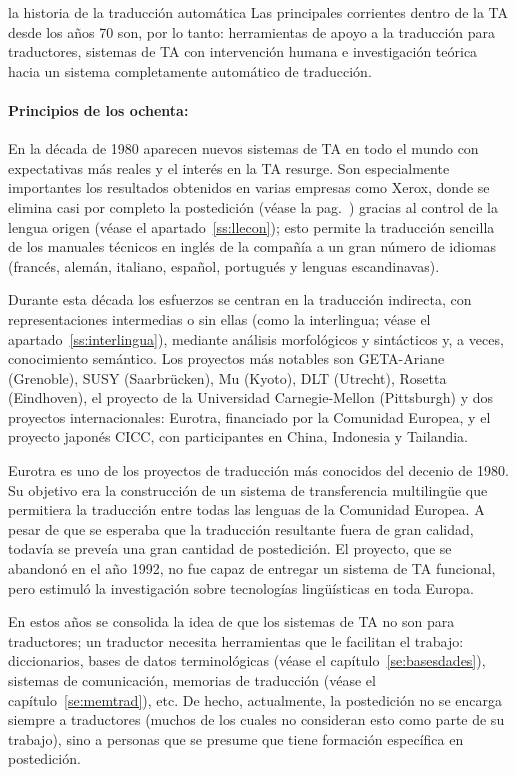 \begin{persabermes}{la historia de la traducción automática}
Las principales corrientes dentro de la TA desde los años 70 son, por lo tanto: herramientas de apoyo a la traducción para traductores, sistemas de TA con intervención humana e investigación teórica hacia un sistema completamente automático de traducción. 

\paragraph{Principios de los ochenta:} En la década de 1980 aparecen nuevos sistemas de TA en todo el mundo con expectativas más reales y el interés en la TA resurge. Son especialmente importantes los resultados obtenidos en varias empresas como Xerox, donde se elimina casi por completo la postedición (véase la pag.~\pageref{pg:homografia}) gracias al control de la lengua origen (véase el apartado~\ref{ss:llecon}); esto permite la traducción sencilla de los manuales técnicos en inglés de la compañía a un gran número de idiomas (francés, alemán, italiano, español, portugués y lenguas escandinavas). 

Durante esta década los esfuerzos se centran en la traducción indirecta, con representaciones intermedias o sin ellas (como la interlingua; véase el apartado~\ref{ss:interlingua}), mediante análisis morfológicos y sintácticos y, a veces, conocimiento semántico. Los proyectos más notables son GETA-Ariane (Grenoble), SUSY (Saarbrücken), Mu (Kyoto), DLT (Utrecht), Rosetta (Eindhoven), el proyecto de la Universidad Carnegie-Mellon (Pittsburgh) y dos proyectos internacionales: Eurotra, financiado por la Comunidad Europea, y el proyecto japonés CICC, con participantes en China, Indonesia y Tailandia. 

Eurotra es uno de los proyectos de traducción más conocidos del decenio de 1980. Su objetivo era la construcción de un sistema de transferencia multilingüe que permitiera la traducción entre todas las lenguas de la Comunidad Europea. A pesar de que se esperaba que la traducción resultante fuera de gran calidad, todavía se preveía una gran cantidad de postedición. El proyecto, que se abandonó en el año 1992, no fue capaz de entregar un sistema de TA funcional, pero estimuló la investigación sobre tecnologías lingüísticas en toda Europa. 

En estos años se consolida la idea de que los sistemas de TA no son para traductores; un traductor necesita herramientas que le facilitan el trabajo: diccionarios, bases de datos terminológicas (véase el capítulo~\ref{se:basesdades}), sistemas de comunicación, memorias de traducción (véase el capítulo~\ref{se:memtrad}), etc. De hecho, actualmente, la postedición no se encarga siempre a traductores (muchos de los cuales no consideran esto como parte de su trabajo), sino a personas que se presume que tiene formación específica en postedición. 


\end{persabermes}
